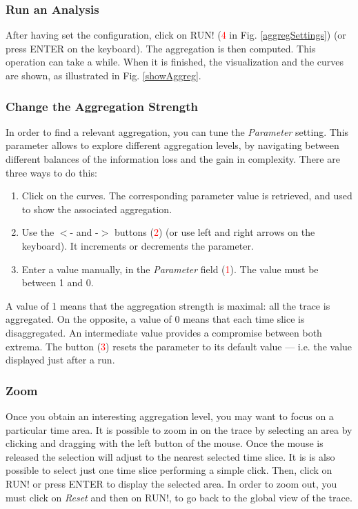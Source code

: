 \documentclass[twoside]{article}
\begin{document}
\begin{sloppypar}
\subsubsection{Run an Analysis}
After having set the configuration, click on RUN! (\textcolor{red}{4} in Fig. \ref{aggregSettings}) (or press ENTER on the keyboard). The aggregation is then computed. This operation can take a while. When it is finished, the visualization and the curves are shown, as illustrated in Fig. \ref{showAggreg}.

\subsubsection{Change the Aggregation Strength}
In order to find a relevant aggregation, you can tune the \textit{Parameter} setting. This parameter allows to explore different aggregation levels, by navigating between different balances of the information loss and the gain in complexity. There are three ways to do this:
\begin{enumerate}
	\item Click on the curves. The corresponding parameter value is retrieved, and used to show the associated aggregation.
	\item Use the $<$- and -$>$ buttons (\textcolor{red}{2}) (or use left and right arrows on the keyboard). It increments or decrements the parameter.
	\item Enter a value manually, in the \textit{Parameter} field (\textcolor{red}{1}). The value must be between 1 and 0.
\end{enumerate}
A value of 1 means that the aggregation strength is maximal: all the trace is aggregated. On the opposite, a value of 0 means that each time slice is disaggregated. An intermediate value provides a compromise between both extrema. The button (\textcolor{red}{3}) resets the parameter to its default value --- i.e. the value displayed just after a run.

\subsubsection{Zoom}
Once you obtain an interesting aggregation level, you may want to focus on a particular time area. It is possible to zoom in on the trace by selecting an area by clicking and dragging with the left button of the mouse. Once the mouse is released the selection will adjust to the nearest selected time slice. It is is also possible to select just one time slice performing a simple click. Then, click on RUN! or press ENTER to display the selected area. In order to zoom out, you must click on \textit{Reset} and then on RUN!, to go back to the global view of the trace.


\end{sloppypar}
\end{document}
